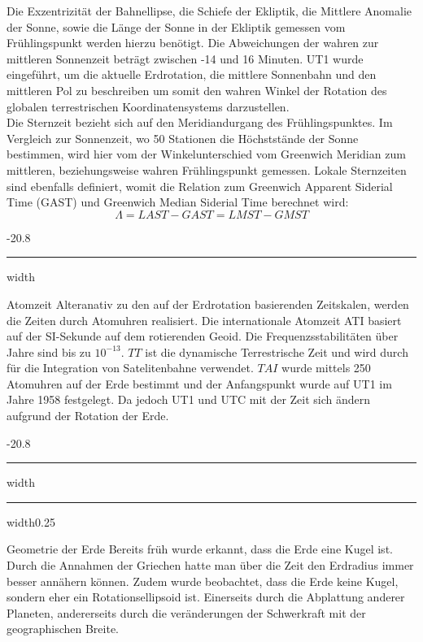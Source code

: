 \documentclass[8pt, landscape, fleqn]{scrartcl}
\makeatletter
\renewcommand{\section}{\@startsection{section}{1}{0mm}%
{-2\baselineskip}{0.8\baselineskip}%
{\hrule depth 0.2pt width\columnwidth\hrule depth1.5pt
width0.25\columnwidth\vspace*{1.2em}\Large\bfseries\rmfamily}}
\renewcommand{\subsubsection}{\@startsection{subsubsection}{1}{0mm}%
{-2\baselineskip}{0.8\baselineskip}%
{\hrule depth 0.2pt width\columnwidth\vspace*{1.2em}\normalsize\bfseries\rmfamily}}
\makeatother
\begin{document}
\begin{multicols*}{3}
Die Exzentrizität der Bahnellipse, die Schiefe der Ekliptik, die Mittlere Anomalie der Sonne, sowie die Länge der Sonne in der Ekliptik gemessen vom Frühlingspunkt werden hierzu benötigt. Die Abweichungen der wahren zur mittleren Sonnenzeit beträgt zwischen -14 und 16 Minuten. UT1 wurde eingeführt, um die aktuelle Erdrotation, die mittlere Sonnenbahn und den mittleren Pol zu beschreiben um somit den wahren Winkel der Rotation des globalen terrestrischen Koordinatensystems darzustellen. \\

Die Sternzeit bezieht sich auf den Meridiandurgang des Frühlingspunktes. Im Vergleich zur Sonnenzeit, wo 50 Stationen die Höchststände der Sonne bestimmen, wird hier vom der Winkelunterschied vom Greenwich Meridian zum mittleren, beziehungsweise wahren Frühlingspunkt gemessen. Lokale Sternzeiten sind ebenfalls definiert, womit die Relation zum Greenwich Apparent Siderial Time (GAST) und Greenwich Median Siderial Time berechnet wird:
\begin{equation*}
    \Lambda = LAST-GAST = LMST - GMST
\end{equation*}
 
\subsubsection{Atomzeit}
Alteranativ zu den auf der Erdrotation basierenden Zeitskalen, werden die Zeiten durch Atomuhren realisiert. Die internationale Atomzeit ATI basiert auf der SI-Sekunde auf dem rotierenden Geoid. Die Frequenzsstabilitäten über Jahre sind bis zu $10^{-13}$. $TT$ ist die dynamische Terrestrische Zeit und wird durch für die Integration von Satelitenbahne verwendet. $TAI$ wurde mittels 250 Atomuhren auf der Erde bestimmt und der Anfangspunkt wurde auf UT1 im Jahre 1958 festgelegt. Da jedoch UT1 und UTC mit der Zeit sich ändern aufgrund der Rotation der Erde.

\section{Geometrie der Erde}
Bereits früh wurde erkannt, dass die Erde eine Kugel ist. Durch die Annahmen der Griechen hatte man über die Zeit den Erdradius immer besser annähern können. Zudem wurde beobachtet, dass die Erde keine Kugel, sondern eher ein Rotationsellipsoid ist. Einerseits durch die Abplattung anderer Planeten,
andererseits durch die veränderungen der Schwerkraft mit der geographischen Breite. 


\end{multicols*}
\end{document}
